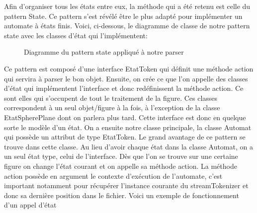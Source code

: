 \documentclass[../../Rapport RayTracer]{subfiles}
\begin{document}
Afin d'organiser tous les états entre eux, la méthode qui a été retenu est celle du pattern State. Ce pattern s'est révélé être le plus adapté pour implémenter un automate à états finis. Voici, ci-dessous, le diagramme de classe de notre pattern state avec les classes d'état qui l'implémentent:

\begin{figure}[h!]
	
	\caption{Diagramme du pattern state appliqué à notre parser}
	\label{diagrammePatternState}
\end{figure}
\FloatBarrier

Ce pattern est composé d'une interface EtatToken qui définit une méthode action qui servira à parser le bon objet. Ensuite, on crée ce que l'on appelle des classes d'état qui implémentent l'interface et donc redéfinissent la méthode action. Ce sont elles qui s'occupent de tout le traitement de la figure. Ces classes correspondent à un seul objet/figure à la fois, à l'exception de la classe EtatSpherePlane dont on parlera plus tard. Cette interface est donc en quelque sorte le modèle d'un état.
On a ensuite notre classe principale, la classe Automat qui possède un attribut de type EtatToken. Le grand avantage de ce pattern se trouve dans cette classe. Au lieu d'avoir chaque état dans la classe Automat, on a un seul état type, celui de l'interface. Dès que l'on se trouve sur une certaine figure on change l'état courant et on appelle sa méthode action. La méthode action possède en argument le contexte d'exécution de l'automate, c'est important notamment pour récupérer l'instance courante du streamTokenizer et donc sa dernière position dans le fichier. Voici un exemple de fonctionnement d'un appel d'état
 
\end{document}
